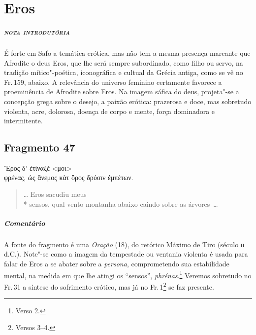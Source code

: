 \chapter{Eros}

\paragraph{\textsc{nota introdutória}} 
É forte em Safo a temática erótica, mas não tem a mesma presença marcante que
Afrodite o deus Eros, que lhe será sempre subordinado, como filho ou servo, na
tradição mítico"-poética, iconográfica e cultual da Grécia antiga, como se vê no
Fr.\,159, abaixo. A relevância do universo feminino certamente favorece a
proeminência de Afrodite sobre Eros. Na imagem sáfica do deus, projeta"-se a
concepção grega sobre o desejo, a paixão erótica: prazerosa e doce, mas
sobretudo violenta, acre, dolorosa, doença de corpo e mente, força dominadora e
intermitente.

\section{Fragmento 47}

\begin{gkverse}
Ἔρος δ’ ἐτίναξέ <μοι>\\
φρένας, ὠς ἄνεμος κὰτ ὄρος δρύσιν ἐμπέτων.
\end{gkverse}

\begin{verse}
\ldots{} Eros sacudiu meus\\*
sensos, qual vento montanha abaixo caindo sobre as \mbox{árvores \ldots{}}
\end{verse}

\medskip

\paragraph{Comentário} A fonte do fragmento é uma \textit{Oração} (18), do retórico Máximo de Tiro (século \textsc{ii} d.C.). \EP[2]
Note"-se como a imagem da tempestade ou ventania violenta é usada para falar de Eros a se abater sobre a \textit{persona}, comprometendo sua estabilidade mental, na medida em que lhe atingi os ``sensos'', \textit{phrénas}.\footnote{Verso 2.} Veremos sobretudo no Fr.\,31 a síntese do sofrimento erótico, mas já no Fr.\,1\footnote{Versos 3--4.} se faz presente.



